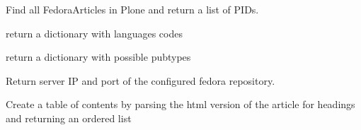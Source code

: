 \documentclass[a4paper,10pt,ngerman]{sphinxmanual}
\begin{document}
\begin{fulllineitems}
\begin{fulllineitems}
\end{fulllineitems}


\begin{fulllineitems}
\label{tools:Products.DiPP.Fedora2DiPP3Tool.Fedora.getFedoraArticles}
Find all FedoraArticles in Plone and return a list of PIDs.

\end{fulllineitems}


\begin{fulllineitems}
\label{tools:Products.DiPP.Fedora2DiPP3Tool.Fedora.getLanguages}
return a dictionary with languages codes

\end{fulllineitems}


\begin{fulllineitems}
\label{tools:Products.DiPP.Fedora2DiPP3Tool.Fedora.getPubtypes}
return a dictionary with possible pubtypes

\end{fulllineitems}


\begin{fulllineitems}
\label{tools:Products.DiPP.Fedora2DiPP3Tool.Fedora.getServerConfiguration}
Return server IP and port of the configured fedora repository.

\end{fulllineitems}


\begin{fulllineitems}
\label{tools:Products.DiPP.Fedora2DiPP3Tool.Fedora.getTOC}
Create a table of contents by parsing the html version
of the article for headings and returning an ordered list


\end{fulllineitems}
\end{fulllineitems}
\end{document}
